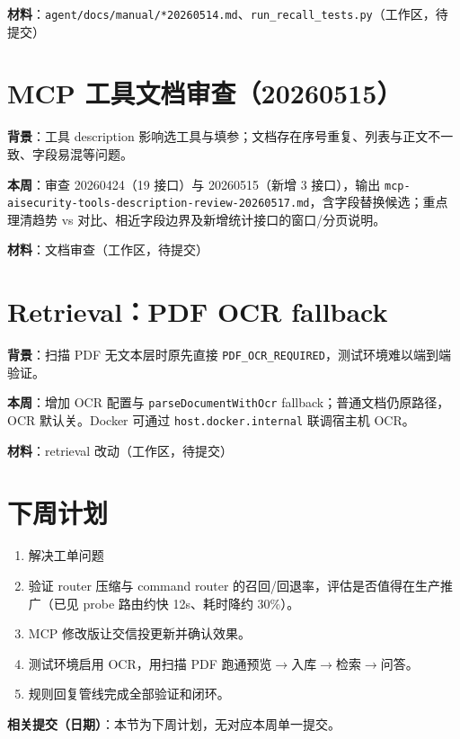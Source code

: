 \documentclass[UTF8]{ctexart}
\begin{document}
\textbf{材料}：\texttt{agent/docs/manual/*20260514.md}、\texttt{run\_recall\_tests.py}（工作区，待提交）

\section{MCP 工具文档审查（20260515）}

\textbf{背景}：工具 description 影响选工具与填参；文档存在序号重复、列表与正文不一致、字段易混等问题。

\textbf{本周}：审查 20260424（19 接口）与 20260515（新增 3 接口），输出 \texttt{mcp-aisecurity-tools-description-review-20260517.md}，含字段替换候选；重点理清趋势 vs 对比、相近字段边界及新增统计接口的窗口/分页说明。

\textbf{材料}：文档审查（工作区，待提交）

\section{Retrieval：PDF OCR fallback}

\textbf{背景}：扫描 PDF 无文本层时原先直接 \texttt{PDF\_OCR\_REQUIRED}，测试环境难以端到端验证。

\textbf{本周}：增加 OCR 配置与 \texttt{parseDocumentWithOcr} fallback；普通文档仍原路径，OCR 默认关。Docker 可通过 \texttt{host.docker.internal} 联调宿主机 OCR。

\textbf{材料}：retrieval 改动（工作区，待提交）

\section{下周计划}

\begin{enumerate}
\item 解决工单问题

\item 验证 router 压缩与 command router 的召回/回退率，评估是否值得在生产推广（已见 probe 路由约快 12s、耗时降约 30\%）。

\item MCP 修改版让交信投更新并确认效果。

\item 测试环境启用 OCR，用扫描 PDF 跑通预览$\rightarrow$入库$\rightarrow$检索$\rightarrow$问答。

\item 规则回复管线完成全部验证和闭环。
\end{enumerate}

\textbf{相关提交（日期）}：本节为下周计划，无对应本周单一提交。
\end{document}

